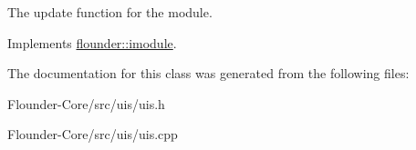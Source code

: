 The update function for the module. 



Implements \hyperlink{classflounder_1_1imodule_a9a53d48a46b5f6b16a92b2cd8503f74a}{flounder\+::imodule}.



The documentation for this class was generated from the following files\+:\begin{DoxyCompactItemize}
\item 
Flounder-\/\+Core/src/uis/uis.\+h\item 
Flounder-\/\+Core/src/uis/uis.\+cpp\end{DoxyCompactItemize}

